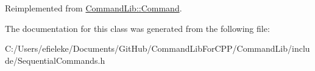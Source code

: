 Reimplemented from \mbox{\hyperlink{class_command_lib_1_1_command_a795a185509e7b0fc1606b3b62fe17fbb}{Command\+Lib\+::\+Command}}.



The documentation for this class was generated from the following file\+:\begin{DoxyCompactItemize}
\item 
C\+:/\+Users/efieleke/\+Documents/\+Git\+Hub/\+Command\+Lib\+For\+C\+P\+P/\+Command\+Lib/include/Sequential\+Commands.\+h\end{DoxyCompactItemize}
